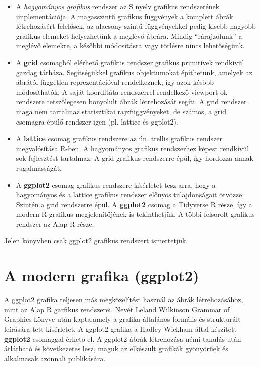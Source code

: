 \documentclass[
]{book}
\begin{document}
\begin{itemize}
\item
  A \emph{hagyományos grafikus} rendszer az S nyelv grafikus rendszerének implementációja. A magasszintű grafikus függvények a komplett ábrák létrehozásért felelősek, az alacsony szintű függvényekkel pedig kisebb-nagyobb grafikus elemeket helyezhetünk a meglévő ábrára. Mindig ``rárajzolunk'' a meglévő elemekre, a későbbi módosításra vagy törlésre nincs lehetőségünk.
\item
  A \textbf{grid} csomagból elérhető grafikus rendszer grafikus primitívek rendkívül gazdag tárháza. Segítségükkel grafikus objektumokat építhetünk, amelyek az ábrától független reprezentációval rendelkeznek, így azok később módosíthatók. A saját koorditáta-rendszerrel rendelkező viewport-ok rendszere tetszőlegesen bonyolult ábrák létrehozását segíti. A grid rendszer maga nem tartalmaz statisztikai rajzfüggvényeket, de számos, a grid csomagra épülő rendszer igen (pl. lattice és ggplot2).
\item
  A \textbf{lattice} csomag grafikus rendszere az ún. trellis grafikus rendszer megvalósítása R-ben. A hagyományos grafikus rendszerhez képest rendkívül sok fejlesztést tartalmaz. A grid grafikus rendszerre épül, így hordozza annak rugalmasságát.
\item
  A \textbf{ggplot2} csomag grafikus rendszere kísérletet tesz arra, hogy a hagyományos és a lattice grafikus rendszer előnyös tulajdonságait ötvözze. Szintén a grid rendszerre épül. A \textbf{ggplot2} csomag a Tidyverse R része, így a modern R grafikus megjelenítőjének is tekinthetjük. A többi felsorolt grafikus rendszer az Alap R része.
\end{itemize}

Jelen könyvben csak ggplot2 grafikus rendszert ismertetjük.

\hypertarget{a-modern-grafika-ggplot2}{%
\section{A modern grafika (ggplot2)}\label{a-modern-grafika-ggplot2}}

A ggplot2 grafika teljesen más megközelítést használ az ábrák létrehozásához, mint az Alap R garfikus rendszerei. Nevét Leland Wilkinson Grammar of Graphics könyve után kapta,amely a grafika általános formális és strukturált leírására tett kísérletet. A ggplot2 grafika a Hadley Wickham által készített \textbf{ggplot2} csomaggal érhető el. A ggplot2 ábrák létrehozása némi tanulás után átlátható és következetes lesz, maguk az elkészült grafikák gyönyörűek és alkalmasak azonnali publikására.
\end{document}
